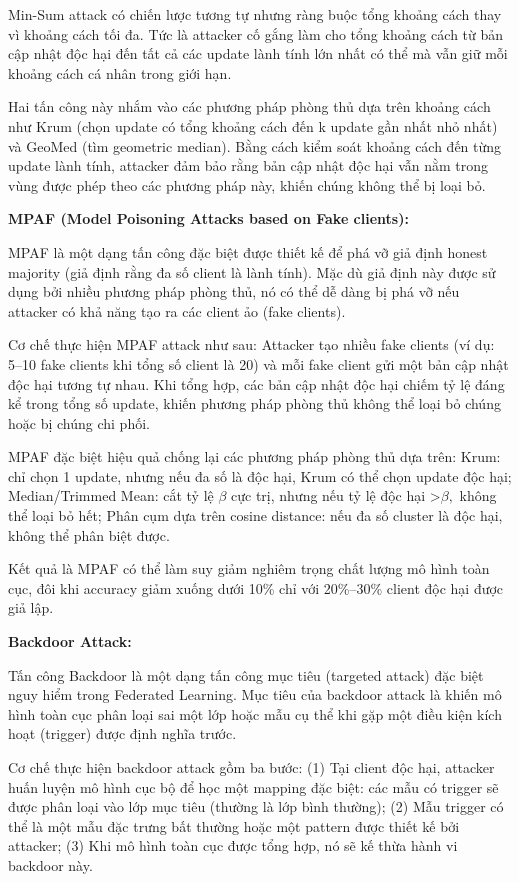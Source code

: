 Min-Sum attack có chiến lược tương tự nhưng ràng buộc tổng khoảng cách thay vì khoảng cách tối đa. Tức là attacker cố gắng làm cho tổng khoảng cách từ bản cập nhật độc hại đến tất cả các update lành tính lớn nhất có thể mà vẫn giữ mỗi khoảng cách cá nhân trong giới hạn.

Hai tấn công này nhắm vào các phương pháp phòng thủ dựa trên khoảng cách như Krum (chọn update có tổng khoảng cách đến k update gần nhất nhỏ nhất) và GeoMed (tìm geometric median). Bằng cách kiểm soát khoảng cách đến từng update lành tính, attacker đảm bảo rằng bản cập nhật độc hại vẫn nằm trong vùng được phép theo các phương pháp này, khiến chúng không thể bị loại bỏ.

\textbf{MPAF (Model Poisoning Attacks based on Fake clients):}

MPAF là một dạng tấn công đặc biệt được thiết kế để phá vỡ giả định honest majority (giả định rằng đa số client là lành tính). Mặc dù giả định này được sử dụng bởi nhiều phương pháp phòng thủ, nó có thể dễ dàng bị phá vỡ nếu attacker có khả năng tạo ra các client ảo (fake clients).

Cơ chế thực hiện MPAF attack như sau: Attacker tạo nhiều fake clients (ví dụ: 5--10 fake clients khi tổng số client là 20) và mỗi fake client gửi một bản cập nhật độc hại tương tự nhau. Khi tổng hợp, các bản cập nhật độc hại chiếm tỷ lệ đáng kể trong tổng số update, khiến phương pháp phòng thủ không thể loại bỏ chúng hoặc bị chúng chi phối.

MPAF đặc biệt hiệu quả chống lại các phương pháp phòng thủ dựa trên: Krum: chỉ chọn 1 update, nhưng nếu đa số là độc hại, Krum có thể chọn update độc hại; Median/Trimmed Mean: cắt tỷ lệ $\beta$ cực trị, nhưng nếu tỷ lệ độc hại \textgreater $\beta,$ không thể loại bỏ hết; Phân cụm dựa trên cosine distance: nếu đa số cluster là độc hại, không thể phân biệt được.

Kết quả là MPAF có thể làm suy giảm nghiêm trọng chất lượng mô hình toàn cục, đôi khi accuracy giảm xuống dưới 10\% chỉ với 20\%--30\% client độc hại được giả lập.

\textbf{Backdoor Attack:}

Tấn công Backdoor là một dạng tấn công mục tiêu (targeted attack) đặc biệt nguy hiểm trong Federated Learning. Mục tiêu của backdoor attack là khiến mô hình toàn cục phân loại sai một lớp hoặc mẫu cụ thể khi gặp một điều kiện kích hoạt (trigger) được định nghĩa trước.

Cơ chế thực hiện backdoor attack gồm ba bước: (1) Tại client độc hại, attacker huấn luyện mô hình cục bộ để học một mapping đặc biệt: các mẫu có trigger sẽ được phân loại vào lớp mục tiêu (thường là lớp bình thường); (2) Mẫu trigger có thể là một mẫu đặc trưng bất thường hoặc một pattern được thiết kế bởi attacker; (3) Khi mô hình toàn cục được tổng hợp, nó sẽ kế thừa hành vi backdoor này.

